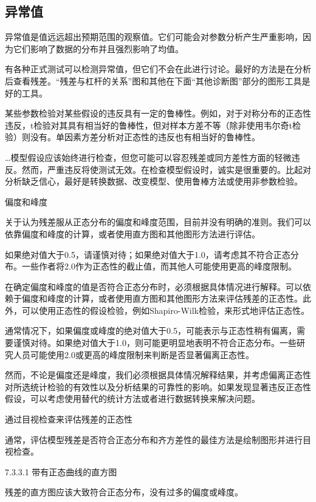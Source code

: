 \documentclass[]{book}
\begin{document}
\hypertarget{ux5f02ux5e38ux503c}{%
\subsection{异常值}\label{ux5f02ux5e38ux503c}}

异常值是值远远超出预期范围的观察值。它们可能会对参数分析产生严重影响，因为它们影响了数据的分布并且强烈影响了均值。

有各种正式测试可以检测异常值，但它们不会在此进行讨论。最好的方法是在分析后查看残差。``残差与杠杆的关系''图和其他在下面``其他诊断图''部分的图形工具是好的工具。

某些参数检验对某些假设的违反具有一定的鲁棒性。例如，对于对称分布的正态性违反，t检验对其具有相当好的鲁棒性，但对样本方差不等（除非使用韦尔奇t检验）则没有。单因素方差分析对正态性的违反也有相当好的鲁棒性。

\ldots{}模型假设应该始终进行检查，但您可能可以容忍残差或同方差性方面的轻微违反。然而，严重违反将使测试无效。在检查模型假设时，诚实是很重要的。比起对分析缺乏信心，最好是转换数据、改变模型、使用鲁棒方法或使用非参数检验。

偏度和峰度

关于认为残差服从正态分布的偏度和峰度范围，目前并没有明确的准则。我们可以依靠偏度和峰度的计算，或者使用直方图和其他图形方法进行评估。

如果绝对值大于0.5，请谨慎对待；如果绝对值大于1.0，请考虑其不符合正态分布。一些作者将2.0作为正态性的截止值，而其他人可能使用更高的峰度限制。

在确定偏度和峰度的值是否符合正态分布时，必须根据具体情况进行解释。可以依赖于偏度和峰度的计算，或者使用直方图和其他图形方法来评估残差的正态性。此外，可以使用正态性的假设检验，例如Shapiro-Wilk检验，来形式地评估正态性。

通常情况下，如果偏度或峰度的绝对值大于0.5，可能表示与正态性稍有偏离，需要谨慎对待。如果绝对值大于1.0，则可能更明显地表明不符合正态分布。一些研究人员可能使用2.0或更高的峰度限制来判断是否显著偏离正态性。

然而，不论是偏度还是峰度，我们必须根据具体情况解释结果，并考虑偏离正态性对所选统计检验的有效性以及分析结果的可靠性的影响。如果发现显著违反正态性假设，可以考虑使用替代的统计方法或者进行数据转换来解决问题。

通过目视检查来评估残差的正态性

通常，评估模型残差是否符合正态分布和齐方差性的最佳方法是绘制图形并进行目视检查。

7.3.3.1 带有正态曲线的直方图

残差的直方图应该大致符合正态分布，没有过多的偏度或峰度。
\end{document}
